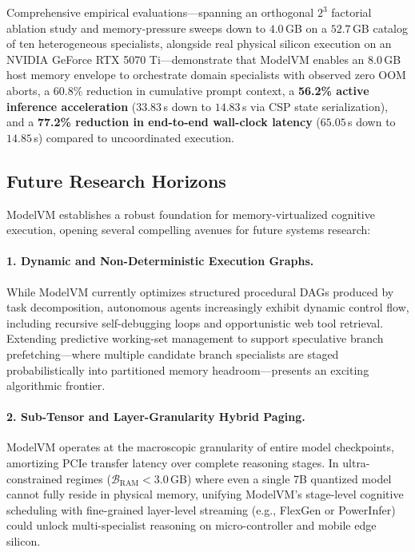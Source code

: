Comprehensive empirical evaluations—spanning an orthogonal $2^3$ factorial ablation study and memory-pressure sweeps down to $4.0$\,GB on a $52.7$\,GB catalog of ten heterogeneous specialists, alongside real physical silicon execution on an NVIDIA GeForce RTX 5070 Ti—demonstrate that ModelVM enables an 8.0\,GB host memory envelope to orchestrate domain specialists with observed zero OOM aborts, a 60.8\% reduction in cumulative prompt context, a \textbf{56.2\% active inference acceleration} ($33.83$\,s down to $14.83$\,s via CSP state serialization), and a \textbf{77.2\% reduction in end-to-end wall-clock latency} ($65.05$\,s down to $14.85$\,s) compared to uncoordinated execution.

\subsection{Future Research Horizons}
\label{sec:future_work}

ModelVM establishes a robust foundation for memory-virtualized cognitive execution, opening several compelling avenues for future systems research:

\paragraph{1. Dynamic and Non-Deterministic Execution Graphs.}
While ModelVM currently optimizes structured procedural DAGs produced by task decomposition, autonomous agents increasingly exhibit dynamic control flow, including recursive self-debugging loops and opportunistic web tool retrieval. Extending predictive working-set management to support speculative branch prefetching—where multiple candidate branch specialists are staged probabilistically into partitioned memory headroom—presents an exciting algorithmic frontier.

\paragraph{2. Sub-Tensor and Layer-Granularity Hybrid Paging.}
ModelVM operates at the macroscopic granularity of entire model checkpoints, amortizing PCIe transfer latency over complete reasoning stages. In ultra-constrained regimes ($\mathcal{B}_{\text{RAM}} < 3.0$\,GB) where even a single 7B quantized model cannot fully reside in physical memory, unifying ModelVM's stage-level cognitive scheduling with fine-grained layer-level streaming (e.g., FlexGen or PowerInfer) could unlock multi-specialist reasoning on micro-controller and mobile edge silicon.

